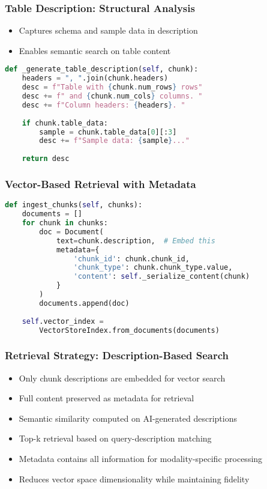 \begin{frame}[fragile]\frametitle{Table Description: Structural Analysis}

\begin{itemize}
\item Captures schema and sample data in description
\item Enables semantic search on table content
\end{itemize}


\begin{lstlisting}[language=Python, basicstyle=\tiny]
def _generate_table_description(self, chunk):
    headers = ", ".join(chunk.headers)
    desc = f"Table with {chunk.num_rows} rows"
    desc += f" and {chunk.num_cols} columns. "
    desc += f"Column headers: {headers}. "
    
    if chunk.table_data:
        sample = chunk.table_data[0][:3]
        desc += f"Sample data: {sample}..."
    
    return desc
\end{lstlisting}

\end{frame}

\begin{frame}[fragile]\frametitle{Vector-Based Retrieval with Metadata}
\begin{lstlisting}[language=Python, basicstyle=\tiny]
def ingest_chunks(self, chunks):
    documents = []
    for chunk in chunks:
        doc = Document(
            text=chunk.description,  # Embed this
            metadata={
                'chunk_id': chunk.chunk_id,
                'chunk_type': chunk.chunk_type.value,
                'content': self._serialize_content(chunk)
            }
        )
        documents.append(doc)
    
    self.vector_index = 
        VectorStoreIndex.from_documents(documents)
\end{lstlisting}
\end{frame}

\begin{frame}[fragile]\frametitle{Retrieval Strategy: Description-Based Search}
\begin{itemize}
\item Only chunk descriptions are embedded for vector search
\item Full content preserved as metadata for retrieval
\item Semantic similarity computed on AI-generated descriptions
\item Top-k retrieval based on query-description matching
\item Metadata contains all information for modality-specific processing
\item Reduces vector space dimensionality while maintaining fidelity
\end{itemize}
\end{frame}

